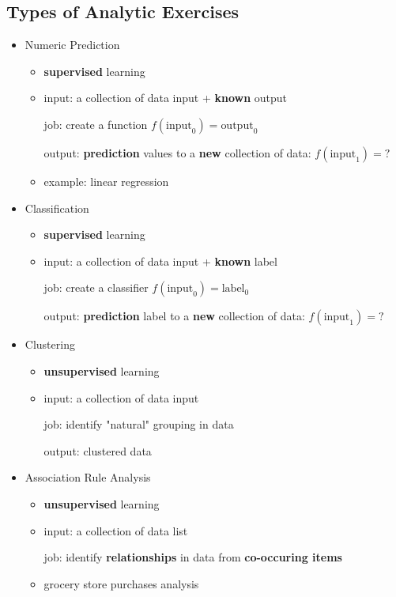\subsection{Types of Analytic Exercises}
\begin{itemize}
	\item Numeric Prediction
	\begin{itemize}
		\item \textbf{supervised} learning
		\item input: a collection of data input + \textbf{known} output
		
			  job: create a function  $f(\text{input}_{0}) = \text{output}_0$
			  
			  output: \textbf{prediction} values to a \textbf{new} collection of data: $f(\text{input}_1) = ?$ 
		\item example: linear regression
	\end{itemize}

	\item Classification
	\begin{itemize}
		\item \textbf{supervised} learning
		\item input: a collection of data input + \textbf{known} label
			
			  job: create a classifier $f(\text{input}_0) = \text{label}_0$
			  
			  output: \textbf{prediction} label to a \textbf{new} collection of data: $f(\text{input}_1) = ?$
	\end{itemize}

	\item Clustering
	\begin{itemize}
		\item \textbf{unsupervised} learning
		\item input: a collection of data input
			  
			  job: identify "natural" grouping in data
			  
			  output: clustered data
	\end{itemize}

	\item Association Rule Analysis
	\begin{itemize}
		\item \textbf{unsupervised} learning
		\item input: a collection of data list
			  
			  job: identify \textbf{relationships} in data from \textbf{co-occuring items}
		\item grocery store purchases analysis
	\end{itemize}
\end{itemize}

